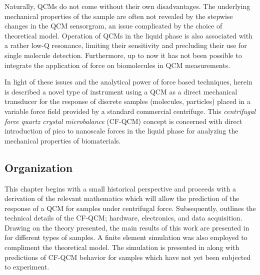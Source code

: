 Naturally, QCMs do not come without their own disadvantages. The underlying
mechanical properties of the sample are often not revealed by the stepwise
changes in the QCM sensorgram, an issue complicated by the choice of
theoretical model.  Operation of QCMs in the liquid phase is also
associated with a rather low-Q resonance, limiting their sensitivity and
precluding their use for single molecule detection.  Furthermore, up to now
it has not been possible to integrate the application of force on
biomolecules in QCM measurements.

In light of these issues and the analytical power of force based
techniques, herein is described a novel type of instrument using a QCM as a
direct mechanical transducer for the response of discrete samples
(molecules, particles) placed in a variable force field provided by a
standard commercial centrifuge.  This \textit{centrifugal force quartz
crystal microbalance} (CF-QCM) concept is concerned with direct
introduction of pico to nanoscale forces in the liquid phase for analyzing
the mechanical properties of biomaterials.

\subsection{Organization}
This chapter begins with a small historical perspective and proceeds
with a derivation of the relevant mathematics which will allow the
prediction of the response of a QCM for samples under centrifugal force.
Subsequently,  outlines the technical details of the
CF-QCM; hardware, electronics, and data acquisition.  Drawing on the theory
presented, the main results of this work are presented in
 for different types of samples.  A
finite element simulation was also employed to compliment the
theoretical model.  The simulation is presented in
 along with predictions of CF-QCM behavior for
samples which have not yet been subjected to experiment.
